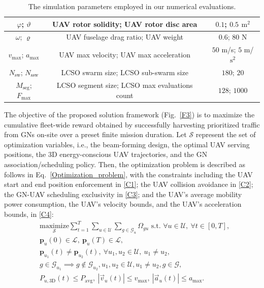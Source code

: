 \documentclass[10pt, twocolumn]{IEEEtran}
\newcommand{\abs}[1]{\left\lvert#1\right\rvert}
\begin{document}
\begin{table} [tb]
\begin{center}
\begin{tabular}{|*{3}{c|}}
        \hline
        $\varphi$; $\vartheta$ & UAV rotor solidity; UAV rotor disc area & $0.1$; $0.5$ $\mathrm{m}^{2}$\\
        \hline
        $\omega$; $\varrho$ & UAV fuselage drag ratio; UAV weight & $0.6$; $80$ N\\
        \hline
        $v_{\mathrm{max}}$; $a_{\mathrm{max}}$ & UAV max velocity; UAV max acceleration & $50$ m/s; $5$ m/$\mathrm{s}^{2}$\\
        \hline
        \hline
        $N_{\mathrm{sw}}$; $N_{\mathrm{ssw}}$ & LCSO swarm size; LCSO sub-swarm size & $180$; $20$\\
        \hline
        $M_{\mathrm{seg}}$; $F_{\mathrm{max}}$ & LCSO segment size; LCSO max evaluations count & $128$; $1000$\\
        \hline
        \end{tabular}
        \vspace{-1mm}
        \caption{The simulation parameters employed in our numerical evaluations.}
        \vspace{-3mm}
        \label{T2}
    \end{center}
\end{table}
The objective of the proposed solution framework (Fig.~\ref{F3}) is to maximize the cumulative fleet-wide reward obtained by successfully harvesting prioritized traffic from GNs on-site over a preset finite mission duration. Let $\mathcal{S}$ represent the set of optimization variables, i.e., the beam-forming design, the optimal UAV serving positions, the $3$D energy-conscious UAV trajectories, and the GN association/scheduling policy. Then, the optimization problem is described as follows in Eq.~\eqref{Optimization_problem}, with the constraints including the UAV start and end position enforcement in \eqref{C1}; the UAV collision avoidance in \eqref{C2}; the GN-UAV scheduling exclusivity in \eqref{C3}; and the UAV's average mobility power consumption, the UAV's velocity bounds, and the UAV's acceleration bounds, in \eqref{C4}:
\begin{align}\label{Optimization_problem}
    &\underset{\mathcal{S}}{\mathrm{maximize}}\sum_{t{=}1}^{T}\sum_{u{\in}\mathcal{U}}\sum_{g{\in}\mathcal{G}_{u}}\Omega_{gu}\text{ s.t. } \forall u \in \mathcal{U},\  \forall t \in [0,T],\\
    &\mathbf{p}_{u}(0) \in \mathcal{L},\ \mathbf{p}_{u}(T) \in \mathcal{L},\label{C1}\tag{C.1}\\
    &\mathbf{p}_{u_{1}}(t) \neq \mathbf{p}_{u_{2}}(t),\ \forall u_{1}, u_{2} \in \mathcal{U},\ u_{1} \neq u_{2},\label{C2}\tag{C.2}\\
    &g \in \mathcal{G}_{u_{1}}{\implies}g \notin \mathcal{G}_{u_{2}}, u_{1}, u_{2} \in \mathcal{U}, u_{1} \neq u_{2}, g \in \mathcal{G},\label{C3}\tag{C.3}\\
    &P_{u,3\mathrm{D}}(t) \leq P_{\mathrm{avg}},\ \abs{\vec{v}_{u}(t)} \leq v_{\mathrm{max}},\ \abs{\vec{a}_{u}(t)} \leq a_{\mathrm{max}}.\label{C4}\tag{C.4}
\end{align}
\end{document}
